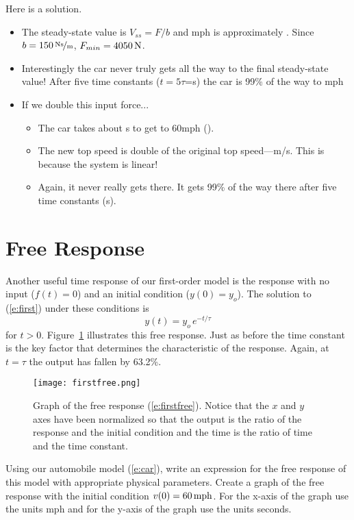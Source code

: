 \ifsolutions
\begin{soln}
Here is a solution.
\begin{itemize}
\item The steady-state value is $V_{ss}=F/b$ and \unit[60]{mph} is approximately .  Since $b=\unitfrac[150]{Ns}{m}$, $F_{min}=\unit[4050]{N}$.
\item Interestingly the car never truly gets all the way to the final steady-state value!  After five time constants ($t=5\tau$=\unit[25]{s}) the car is 99\% of the way to \unit[60]{mph}
\item If we double this input force...
\begin{itemize}
\item The car takes about \unit[4]{s} to get to \unit{60}{mph} ().
\item The new top speed is double of the original top speed---\unit[120]{m/s}.  This is because the system is linear!
\item Again, it never really gets there.  It gets 99\% of the way there after five time constants (\unit[25]{s}).
\end{itemize}
\end{itemize}
\end{soln}
\fi

\section{Free Response}
Another useful time response of our first-order model is the response with no input ($f(t)=0$) and an initial condition ($y(0)=y_o$).  The solution to (\ref{e:first}) under these conditions is 
\begin{equation}\label{e:firstfree}
y(t) = y_o \, e^{-t/\tau}
\end{equation}
for $t>0$. Figure~\ref{f:firstfree} illustrates this free response.  Just as before the time constant is the key factor that determines the characteristic of the response.  Again, at $t=\tau$ the output has fallen by 63.2\%.
\begin{figure}[hbt]
\centering
\texttt{[image: firstfree.png]}
\caption{Graph of the free response (\ref{e:firstfree}).  Notice that the $x$ and $y$ axes have been normalized so that the output is the ratio of the response and the initial condition and the time is the ratio of time and the time constant.}
\label{f:firstfree}
\end{figure}

\begin{ex}
Using our automobile model (\ref{e:car}), write an expression for the free response of this model with appropriate physical parameters.  Create a graph of the free response with the initial condition $v(0)=\unit[60]{mph}$. For the x-axis of the graph use the units mph and for the y-axis of the graph use the units seconds.
\end{ex}

